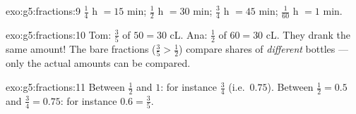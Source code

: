 \begin{solution}{exo:g5:fractions:9}
$\frac14$ h $= 15$ min; $\frac12$ h $= 30$ min; $\frac34$ h $= 45$
min; $\frac{1}{60}$ h $= 1$ min.
\end{solution}

\begin{solution}{exo:g5:fractions:10}
Tom: $\frac35$ of $50 = 30$ cL. Ana: $\frac12$ of $60 = 30$ cL. They
drank the same amount! The bare fractions ($\frac35 > \frac12$)
compare shares of \emph{different} bottles --- only the actual
amounts can be compared.
\end{solution}

\begin{solution}{exo:g5:fractions:11}
Between $\frac12$ and $1$: for instance $\frac34$ (i.e.\ $0.75$).
Between $\frac12 = 0.5$ and $\frac34 = 0.75$: for instance $0.6 =
\frac35$.
\end{solution}
